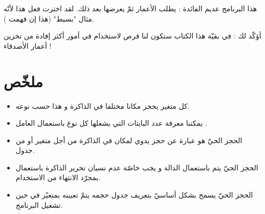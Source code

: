 هذا البرنامج عديم الفائدة : يطلب الأعمار ثمّ يعرضها بعد ذلك. لقد اخترت فعل هذا لأنّه مثال "بسيط" (هذا إن فهمت
).

أؤكّد لك : في بقيّة هذا الكتاب ستكون لنا فرص لاستخدام
في أمور أكثر إفادة من تخزين أعمار الأصدقاء !

\section*{ملخّص}

\begin{itemize}
  \item كل متغير يحجز مكانا مختلفا في الذاكرة و هذا حسب نوعه.
  \item يمكننا معرفة عدد البايتات التي يشغلها كل نوع باستعمال العامل .
  \item الحجز الحيّ هو عبارة عن حجز يدوي لمكان في الذاكرة من أجل متغير أو من جدول.
  \item الحجز الحيّ يتم باستعمال الدالة
و يجب خاصّة عدم نسيان تحرير الذاكرة باستعمال
بمجرّد الانتهاء من الاستخدام.
  \item الحجز الحيّ يسمح بشكل أساسيّ بتعريف جدول حجمه يتمّ تعيينه بمتغيّر في حين تشغيل البرنامج.
\end{itemize}
